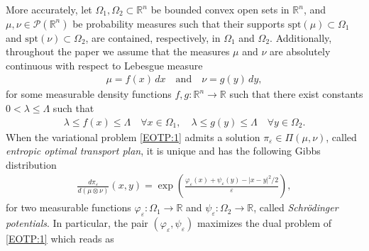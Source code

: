 \documentclass[reqno,12pt]{article}
\newcommand{\R}{\mathbb{R}}
\begin{document}
More accurately, let $\Omega_1,\Omega_2\subset \R^n$ be bounded convex open sets in $\R^n$, and  $\mu,\nu\in\mathcal{P}(\R^n)$ be probability measures such that their supports $\mathrm{spt}(\mu)\subset \Omega_1$ and $\mathrm{spt}(\nu)\subset \Omega_2$, are contained, respectively, in $\Omega_1$ and $\Omega_2$. Additionally, throughout the paper we assume that the measures $\mu$ and $\nu$ are absolutely continuous with respect to Lebesgue measure
\begin{align}
    \label{density:1}
    \mu = f(x)\,dx
    \quad\text{and}\quad
    \nu = g(y)\,dy,
\end{align}
for some measurable density functions $f,g:\R^n\to\R$ such that there exist constants $0<\lambda\leqslant \Lambda$ such that 
\begin{align}
    \label{density:2}
    \lambda \leqslant f(x) \leqslant \Lambda\quad \forall x\in\Omega_1,\quad
    \lambda \leqslant g(y) \leqslant \Lambda\quad \forall y\in \Omega_2.
\end{align}
When the variational problem \eqref{EOTP:1} admits a solution $\pi_{\varepsilon} \in \Pi(\mu,\nu)$, called \textit{entropic optimal transport plan}, it is unique and has the following Gibbs distribution~\cite{DG20, LeoSurvey}
\begin{align}
    \label{dens:phi:1}
    \frac{d\pi_{\varepsilon}}{d(\mu\otimes\nu)}(x,y) = \exp\left(\frac{\varphi_{\varepsilon}(x) + \psi_{\varepsilon}(y)-|x-y|^{2}/2}{\varepsilon} \right),
\end{align}
for two measurable functions $\varphi_{\varepsilon} : \Omega_1\rightarrow \R$ and $\psi_{\varepsilon} : \Omega_2\rightarrow \R$, called \textit{Schr\"odinger potentials}. In particular, the pair $(\varphi_{\varepsilon}, \psi_{\varepsilon})$ maximizes the dual problem of \eqref{EOTP:1} which reads as
\end{document}
